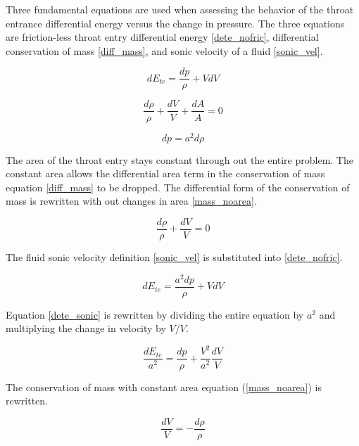 \documentclass[../ellis_thesis.tex]{subfiles}
\begin{document}
Three fundamental equations are used when assessing the behavior of the throat entrance differential energy versus the change in pressure. The three equations are friction-less throat entry differential energy \eqref{dete_nofric}, differential conservation of mass \eqref{diff_mass}, and sonic velocity of a fluid \eqref{sonic_vel}.

\begin{equation}
dE_{te} = \frac{dp}{\rho} + VdV
\label{dete_nofric}
\end{equation}

\begin{equation}
\frac{d\rho}{\rho} + \frac{dV}{V} + \frac{dA}{A} = 0
\label{diff_mass}
\end{equation}

\begin{equation}
dp = a^2d\rho
\label{sonic_vel}
\end{equation}

The area of the throat entry stays constant through out the entire problem. The constant area allows the differential area term in the conservation of mass equation \eqref{diff_mass} to be dropped. The differential form of the conservation of mass is rewritten with out changes in area \eqref{mass_noarea}.

\begin{equation}
\frac{d\rho}{\rho} + \frac{dV}{V} = 0
\label{mass_noarea}
\end{equation}

The fluid sonic velocity definition \eqref{sonic_vel} is substituted into \dete \eqref{dete_nofric}.

\begin{equation}
dE_{te} = \frac{a^{2}dp}{\rho} + VdV
\label{dete_sonic}
\end{equation}

Equation \eqref{dete_sonic} is rewritten by dividing the entire equation by $a^{2}$ and multiplying the change in velocity by $V/V$.

\begin{equation}
\frac{dE_{te}}{a^{2}} = \frac{dp}{\rho} + \frac{V^2}{a^2}\frac{dV}{V}
\label{dete_complex}
\end{equation}

The conservation of mass with constant area equation (\ref{mass_noarea}) is rewritten.

\begin{equation}
\frac{dV}{V} = - \frac{d\rho}{\rho}
\label{mass_equal}
\end{equation}
\end{document}
